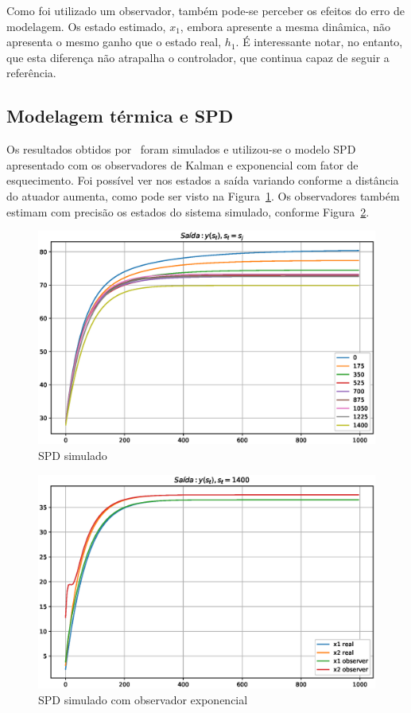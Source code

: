 Como foi utilizado um observador, também pode-se perceber os efeitos do erro de
modelagem. Os estado estimado, \( x_1 \), embora apresente a mesma dinâmica, não
apresenta o mesmo ganho que o estado real, \( h_1 \). É interessante notar, no
entanto, que esta diferença não atrapalha o controlador, que continua capaz de
seguir a referência.

\subsection{Modelagem térmica e SPD}%
\label{subsec:spd-studies}

Os resultados obtidos por~\textcite{masterthesis:nelson} foram simulados e
utilizou-se o modelo \ac{SPD} apresentado com os observadores de Kalman e
exponencial com fator de esquecimento. Foi possível ver nos estados a saída
variando conforme a distância do atuador aumenta, como pode ser visto na
Figura~\ref{fig:spd-sim}. Os observadores também estimam com precisão os estados
do sistema simulado, conforme Figura~\ref{fig:spd-obs}.

\begin{figure}[ht!]
	\centering
	\captionsetup{justification=centering}
	\includegraphics[height=0.5\linewidth]{imgs/spd-sim}
	\caption{SPD simulado}%
	\label{fig:spd-sim}
\end{figure}

\begin{figure}[ht!]
	\centering
	\captionsetup{justification=centering}
	\includegraphics[height=0.5\linewidth]{imgs/spd-obs}
	\caption{SPD simulado com observador exponencial}%
	\label{fig:spd-obs}
\end{figure}

